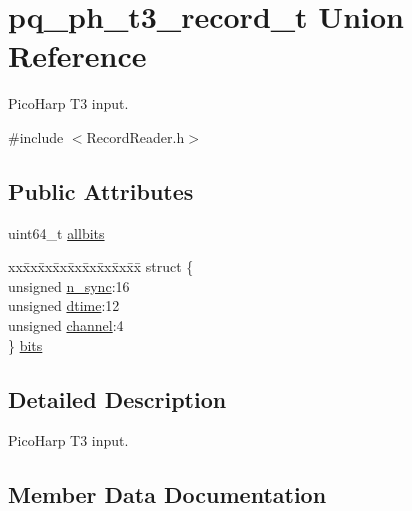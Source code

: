 \hypertarget{unionpq__ph__t3__record__t}{}\section{pq\+\_\+ph\+\_\+t3\+\_\+record\+\_\+t Union Reference}
\label{unionpq__ph__t3__record__t}


Pico\+Harp T3 input.  




{\ttfamily \#include $<$Record\+Reader.\+h$>$}

\subsection*{Public Attributes}
\begin{DoxyCompactItemize}
\item 
uint64\+\_\+t \hyperlink{unionpq__ph__t3__record__t_aad332189f29dad810c7cfa6f574ede33}{allbits}
\item 
\begin{tabbing}
xx\=xx\=xx\=xx\=xx\=xx\=xx\=xx\=xx\=\kill
struct \{\\
\>unsigned \hyperlink{unionpq__ph__t3__record__t_a4f3d223cee4bda4d37f39407ec2b03be}{n\_sync}:16\\
\>unsigned \hyperlink{unionpq__ph__t3__record__t_aff718719db882e0010b9174bd6c5ae52}{dtime}:12\\
\>unsigned \hyperlink{unionpq__ph__t3__record__t_a5979174efc74165de764bc433457a6b1}{channel}:4\\
\} \hyperlink{unionpq__ph__t3__record__t_ac2a2b808ea6dcd69a3caad2f9fd12986}{bits}\\

\end{tabbing}\end{DoxyCompactItemize}


\subsection{Detailed Description}
Pico\+Harp T3 input. 

\subsection{Member Data Documentation}
\mbox{\label{unionpq__ph__t3__record__t_aad332189f29dad810c7cfa6f574ede33}} 
